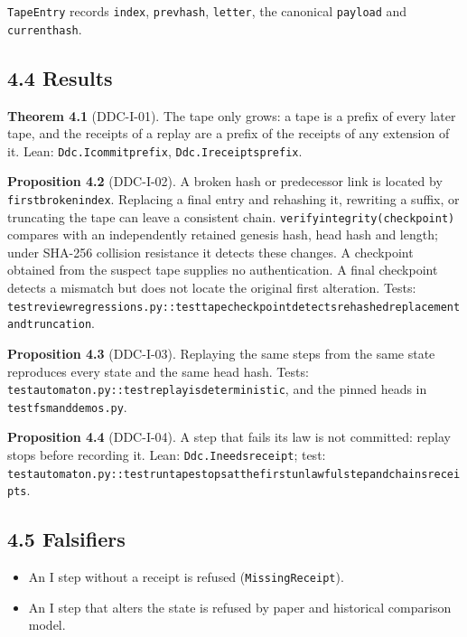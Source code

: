\documentclass[
  11pt,
]{article}
\providecommand{\tightlist}{%
  \setlength{\itemsep}{0pt}\setlength{\parskip}{0pt}}
\renewcommand{\_}{\ddcunderscore\allowbreak}
\begin{document}
\texttt{Tape\allowbreak Entry} records \texttt{index}, \texttt{prev\_hash},
\texttt{letter}, the canonical \texttt{payload} and
\texttt{current\_hash}.

\subsection{4.4 Results}\label{results-3}

\textbf{Theorem 4.1} (DDC-I-01). The tape only grows: a tape is a prefix
of every later tape, and the receipts of a replay are a prefix of the
receipts of any extension of it. Lean: \texttt{Ddc.\allowbreak I\_commit\_prefix},
\texttt{Ddc.\allowbreak I\_receipts\_prefix}.

\textbf{Proposition 4.2} (DDC-I-02). A broken hash or predecessor link
is located by \texttt{first\_broken\_index}. Replacing a final entry and
rehashing it, rewriting a suffix, or truncating the tape can leave a
consistent chain. \texttt{verify\_integrity(checkpoint)} compares with
an independently retained genesis hash, head hash and length; under
SHA-256 collision resistance it detects these changes. A checkpoint
obtained from the suspect tape supplies no authentication. A final
checkpoint detects a mismatch but does not locate the original first
alteration. Tests:
\texttt{test\_review\_regressions.\allowbreak py::test\_tape\_checkpoint\_detects\_rehashed\_replacement\_and\_truncation}.

\textbf{Proposition 4.3} (DDC-I-03). Replaying the same steps from the
same state reproduces every state and the same head hash. Tests:
\texttt{test\_automaton.\allowbreak py::test\_replay\_is\_deterministic}, and the
pinned heads in \texttt{test\_fsm\_and\_demos.\allowbreak py}.

\textbf{Proposition 4.4} (DDC-I-04). A step that fails its law is not
committed: replay stops before recording it. Lean:
\texttt{Ddc.\allowbreak I\_needs\_receipt}; test:
\texttt{test\_automaton.\allowbreak py::test\_run\_tape\_stops\_at\_the\_first\_unlawful\_step\_and\_chains\_receipts}.

\subsection{4.5 Falsifiers}\label{falsifiers-3}

\begin{itemize}
\tightlist
\item
  An I step without a receipt is refused (\texttt{Missing\allowbreak Receipt}).
\item
  An I step that alters the state is refused by paper and historical
  comparison model.
\end{itemize}
\end{document}
